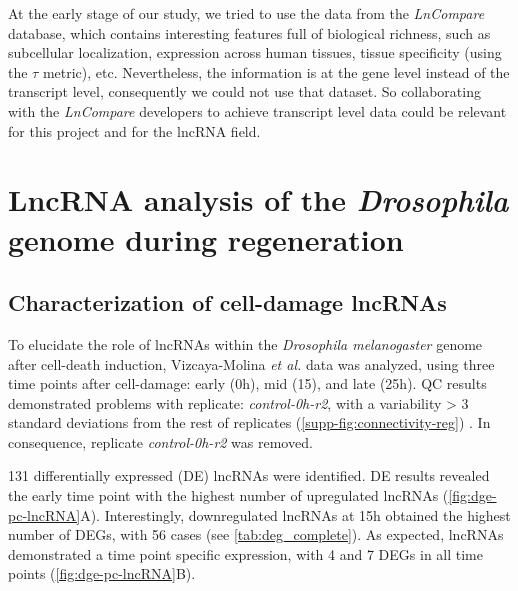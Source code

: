 At the early stage of our study, we tried to use the data from the \textit{LnCompare} database,\autocite{carlevaro_2019_lncompare} which contains interesting features full of biological richness, such as subcellular localization, expression across human tissues, tissue specificity (using the $\tau$ metric), etc. Nevertheless, the information is at the gene level instead of the transcript level, consequently we could not use that dataset. So collaborating with the \textit{LnCompare} developers to achieve transcript level data could be relevant for this project and for the lncRNA field.  

\clearpage

\section[LncRNA analysis of the \textit{Drosophila} genome during regeneration]{LncRNA analysis of the \textit{Drosophila} genome during regeneration}
\label{sec:results-dme}

\subsection{Characterization of cell-damage lncRNAs}
\label{sec:ge-reg-results}

To elucidate the role of lncRNAs within the \textit{Drosophila melanogaster} genome after cell-death induction, Vizcaya-Molina \textit{et al.}\autocite{vizcaya_2018} data was analyzed, using three time points after cell-damage: early (0h), mid (15), and late (25h). QC results demonstrated problems with replicate: \textit{control-0h-r2}, with a variability > 3 standard deviations from the rest of replicates (\autoref{supp-fig:connectivity-reg}) . In consequence, replicate \textit{control-0h-r2} was removed.

131 differentially expressed (DE) lncRNAs were identified. DE results revealed the early time point with the highest number of upregulated lncRNAs (\autoref{fig:dge-pc-lncRNA}A). Interestingly, downregulated lncRNAs at 15h obtained the highest number of DEGs, with 56 cases (see \autoref{tab:deg_complete}). As expected, lncRNAs demonstrated a time point specific expression, with 4 and 7 DEGs in all time points (\autoref{fig:dge-pc-lncRNA}B). 

